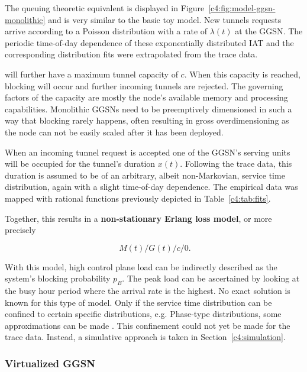 The queuing theoretic equivalent is displayed in Figure~\ref{c4:fig:model-ggsn-monolithic} and is very similar to the basic toy model.
New tunnels requests arrive according to a Poisson distribution with a rate of $\lambda(t)$ at the \gls{GGSN}. The periodic time-of-day dependence of these exponentially distributed \gls{IAT} and the corresponding distribution fits were extrapolated from the trace data.

 will further have a maximum tunnel capacity of $c$. When this capacity is reached, blocking will occur and further incoming tunnels are rejected. The governing factors of the capacity are mostly the node's available memory and processing capabilities. Monolithic \glspl{GGSN} need to be preemptively dimensioned in such a way that blocking rarely happens, often resulting in gross overdimensioning as the node can not be easily scaled after it has been deployed.

When an incoming tunnel request is accepted one of the \gls{GGSN}'s serving units will be occupied for the tunnel's duration $x(t)$. Following the trace data, this duration is assumed to be of an arbitrary, albeit non-Markovian, service time distribution, again with a slight time-of-day dependence.
The empirical data was mapped with rational functions previously depicted in Table~\ref{c4:tab:fits}.

Together, this results in a \textbf{non-stationary Erlang loss model}, or more precisely

\begin{equation}
\phantom{.}M(t)/G(t)/c/0\text{.}
\end{equation}

With this model, high control plane load can be indirectly described as the system's blocking probability $p_B$. The peak load can be ascertained by looking at the busy hour period where the arrival rate is the highest. No exact solution is known for this type of model. Only if the service time distribution can be confined to certain specific distributions, e.g. Phase-type distributions, some approximations can be made \cite{davis1995nonstationaryerlang}. This confinement could not yet be made for the trace data. Instead, a simulative approach is taken in Section~\ref{c4:simulation}.


\subsubsection{Virtualized \texorpdfstring{\acrshort{GGSN}}{GGSN}}
\label{c4:sec:virtual_ggsn}

